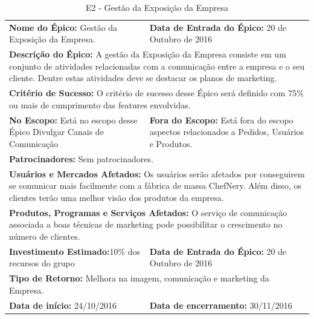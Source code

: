 \begin{table}[]
\centering
\caption{E2 - Gestão da Exposição da Empresa}
\label{my-label}
\begin{tabular}{|p{7cm}|p{8cm}|}
\cline{1-2}
\textbf{Nome do Épico:} Gestão da Exposição da Empresa.&  \textbf{Data de Entrada do Épico:} 20 de Outubro de 2016\\ \cline{1-2}
\multicolumn{2}{|p{15cm}|}{ \textbf{Descrição do Épico:} A gestão da Exposição da Empresa consiste em um conjunto de atividades relacionadas com a comunicação entre a empresa e o seu cliente. Dentre estas atividades deve se destacar os planos de marketing.} \\ \cline{1-2}
\multicolumn{2}{|p{15cm}|}{\textbf{Critério de Sucesso:}
O critério de sucesso desse Épico será definido com 75\% ou mais de cumprimento das features envolvidas.} \\ \cline{1-2}
\textbf{No Escopo:} Está no escopo desse Épico Divulgar Canais de Comunicação &  \textbf{Fora do Escopo:} Está fora do escopo aspectos relacionados a Pedidos, Usuários e Produtos.\\ \cline{1-2}
\multicolumn{2}{|p{15cm}|}{ \textbf{Patrocinadores:} Sem patrocinadores.} \\ \cline{1-2}
\multicolumn{2}{|p{15cm}|}{\textbf{Usuários e Mercados Afetados:} Os usuários serão afetados por conseguirem se comunicar mais facilmente com a fábrica de massa ChefNery. Além disso, os clientes terão uma melhor visão dos produtos da empresa.} \\ \cline{1-2}
\multicolumn{2}{|p{15cm}|}{\textbf{Produtos, Programas e Serviços Afetados:} O serviço de comunicação associada a boas técnicas de marketing pode possibilitar o crescimento no número de clientes.
} \\ \cline{1-2}
\textbf{Investimento Estimado:}10\% dos recursos do grupo &  \textbf{Data de Entrada do Épico:} 20 de Outubro de 2016\\ \cline{1-2}
\multicolumn{2}{|p{15cm}|}{\textbf{Tipo de Retorno:} Melhora na imagem, comunicação e marketing da  Empresa.} \\ \cline{1-2}
\textbf{Data de início:} 24/10/2016 & \textbf{Data de encerramento:} 30/11/2016\\ \cline{1-2}
\end{tabular}
\end{table}

\tab \\ \\ \\ \\ \\ \\ \\ \\ \\ \\ \\ \\


